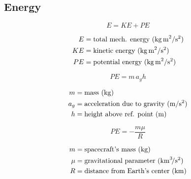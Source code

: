 \documentclass{article}
\begin{document}
\subsection{Energy}
\begin{multicols}{3}
	\begin{equation*}
	\boxed{E = KE + PE}
	\end{equation*}

	\begin{align*}
	E &= \text{total mech. energy (\si{\kilo\gram\,\meter\squared\per\second\squared)}}\\
	KE &= \text{kinetic energy (\si{\kilo\gram\,\meter\squared\per\second\squared)}}\\
	PE &= \text{potential energy (\si{\kilo\gram\,\meter\squared\per\second\squared)}}\\
	\end{align*}

	\vfill\null
	\columnbreak

	\begin{equation*}
	\boxed{PE = m\,a_{g}h}
	\end{equation*}

	\begin{align*}
	m &= \text{mass (\si{\kilo\gram})}\\
	a_{g} &= \text{acceleration due to gravity (\si{\meter\per\second\squared})}\\
	h &= \text{height above ref. point (\si{\meter})}\\
	\end{align*}
	\vfill\null
	\columnbreak

	\begin{equation*}
	\boxed{PE = -\dfrac{m\mu}{R}}
	\end{equation*}

	\begin{align*}
	m &= \text{spacecraft's mass (\si{\kilo\gram})}\\
	\mu &= \text{gravitational parameter (\si{\kilo\meter\cubed\per\second\squared})}\\
	R &= \text{distance from Earth's center (\si{\kilo\meter})}\\
	\end{align*}
	\vfill\null
\end{multicols}
\end{document}
